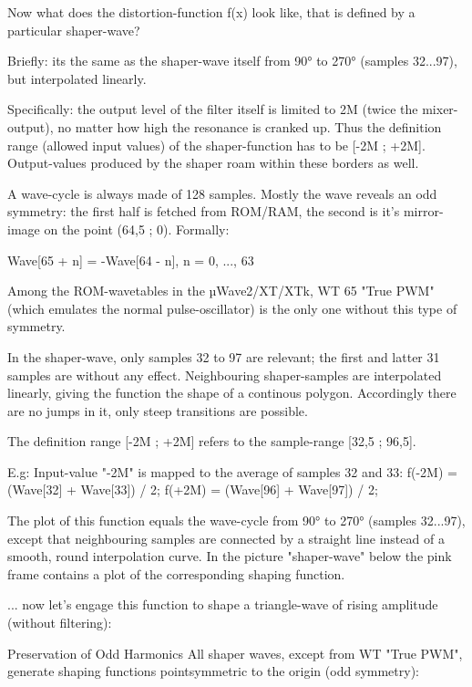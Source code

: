 {	Now what does the distortion-function f(x) look like, that is defined by a particular shaper-wave?
	
	Briefly: its the same as the shaper-wave itself from 90° to 270° (samples 32...97), but interpolated linearly.
	
	Specifically: the output level of the filter itself is limited to 2M (twice the mixer-output), no matter how high the resonance is cranked up. Thus the definition range (allowed input values) of the shaper-function has to be [-2M ; +2M]. Output-values produced by the shaper roam within these borders as well.
	
	A wave-cycle is always made of 128 samples. Mostly the wave reveals an odd symmetry: the first half is fetched from ROM/RAM, the second is it's mirror-image on the point (64,5 ; 0). Formally:
	
	Wave[65 + n] = -Wave[64 - n], n = 0, ..., 63
	
	Among the ROM-wavetables in the µWave2/XT/XTk, WT 65 "True PWM" (which emulates the normal pulse-oscillator) is the only one without this type of symmetry.
	
	In the shaper-wave, only samples 32 to 97 are relevant; the first and latter 31 samples are without any effect. Neighbouring shaper-samples are interpolated linearly, giving the function the shape of a continous polygon. Accordingly there are no jumps in it, only steep transitions are possible.
	
	The definition range [-2M ; +2M] refers to the sample-range [32,5 ; 96,5].
	
	E.g: Input-value "-2M" is mapped to the average of samples 32 and 33:
	f(-2M) = (Wave[32] + Wave[33]) / 2;
	f(+2M) = (Wave[96] + Wave[97]) / 2;
	
	The plot of this function equals the wave-cycle from 90° to 270° (samples 32...97), except that neighbouring samples are connected by a straight line instead of a smooth, round interpolation curve. In the picture "shaper-wave" below the pink frame contains a plot of the corresponding shaping function.
	
	
	
	
	... now let's engage this function to shape a triangle-wave of rising amplitude (without filtering):
	
	
	
	
	
	
	
	Preservation of Odd Harmonics
	All shaper waves, except from WT "True PWM", generate shaping functions pointsymmetric to the origin (odd symmetry):
	
}
